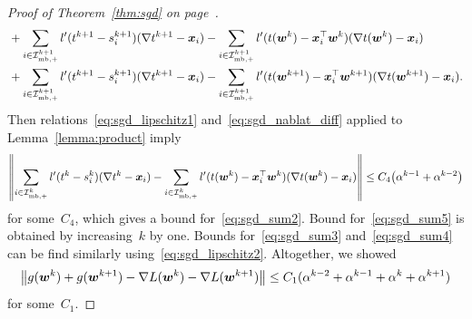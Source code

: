 \begin{proof}[Proof of Theorem~\ref{thm:sgd} on page~\pageref{thm:sgd}]
\begin{subequations}
\begin{align}
    \label{eq:sgd_sum4}
    & + \sum_{i \in \mathcal{I}_{\text{mb},+}^{k+1}} l'(t^{k+1} - s_i^{k+1})(\nabla t^{k+1} - \bm{x}_i) - \sum_{i\in \mathcal{I}_{\text{mb},+}^{k+1}}l'(t(\bm{w}^k) - \bm{x}_i^\top \bm{w}^k)(\nabla t(\bm{w}^k) - \bm{x}_i) \\
    \label{eq:sgd_sum5}
    & + \sum_{i \in \mathcal{I}_{\text{mb},+}^{k+1}} l'(t^{k+1} - s_i^{k+1})(\nabla t^{k+1} - \bm{x}_i)  - \sum_{i \in \mathcal{I}_{\text{mb},+}^{k+1}} l'(t(\bm{w}^{k+1}) - \bm{x}_i^\top \bm{w}^{k+1})(\nabla t(\bm{w}^{k+1}) - \bm{x}_i).
    \end{align}
  \end{subequations}
  Then relations~\eqref{eq:sgd_lipschitz1} and~\eqref{eq:sgd_nablat_diff} applied to Lemma~\ref{lemma:product} imply
  \begin{equation*}
    \norm{\sum_{i \in \Imbpos^k} l'(t^k - s_i^k)(\nabla t^k - \bm{x}_i) - \sum_{i \in \Imbpos^k} l'(t(\bm{w}^k) - \bm{x}_i^\top \bm{w}^k)(\nabla t(\bm{w}^k) - \bm{x}_i)} \leq C_4 \Brac{\alpha^{k-1} + \alpha^{k-2}}
  \end{equation*}
  for some~$C_4$, which gives a bound for~\eqref{eq:sgd_sum2}. Bound for~\eqref{eq:sgd_sum5} is obtained by increasing~$k$ by one. Bounds for~\eqref{eq:sgd_sum3} and~\eqref{eq:sgd_sum4} can be find similarly using~\eqref{eq:sgd_lipschitz2}. Altogether, we showed
  \begin{equation}\label{eq:nec_cond3}
    \norm{g(\bm{w}^k) + g(\bm{w}^{k+1}) - \nabla L(\bm{w}^k) - \nabla L(\bm{w}^{k+1})}
      \leq C_1(\alpha^{k-2} + \alpha^{k-1} + \alpha^{k} + \alpha^{k+1})
  \end{equation}
  for some~$C_1$.
  

\end{proof}
